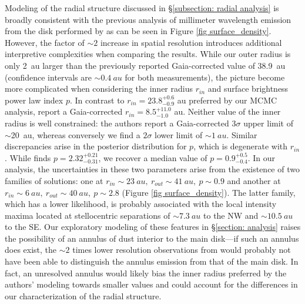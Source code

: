 \documentclass[modern]{aastex62}
\begin{document}
Modeling of the radial structure discussed in \S \ref{subsection: radial analysis} is broadly consistent with the previous analysis of millimeter wavelength emission from the disk performed by \citet{macgregor13} as can be seen in Figure \ref{fig surface_density}. 
However, the factor of $\sim 2$ increase in spatial resolution introduces additional interpretive complexities when comparing the results.
While our outer radius is only \SI{2}{au} larger than the previously reported Gaia-corrected value of \SI{38.9}{au} (confidence intervals are $\sim \SI{0.4}{au}$ for both measurements), the picture become more complicated when considering the inner radius $r_{in}$ and surface brightness power law index $p$.
In contrast to $r_{in} = 23.8_{-0.9}^{ +0.6}$ \si{au} preferred by our MCMC analysis, \citet{macgregor13} report a Gaia-corrected $r_{in} = 8.5_{-1.0} ^{+11.0}$ \si{au}.
Neither value of the inner radius is well constrained: the authors report a Gaia-corrected $3 \sigma$ upper limit of $\sim$\SI{20}{au}, whereas conversely we find a $2 \sigma$ lower limit of $\sim \SI{1}{au}$.
Similar discrepancies arise in the posterior distribution for $p$, which is degenerate with $r_{in}$.
While \citet{macgregor13} finds $p=2.32_{-0.31}^{+0.21}$, we recover a median value of $p=0.9_{-0.4}^{+0.5}$.
In our analysis, the uncertainties in these two parameters arise from the existence of two families of solutions: one at $r_{in} \sim \SI{23}{au},\ r_{out} \sim \SI{41}{au},\ p \sim 0.9$ and another at $r_{in} \sim \SI{6}{au},\ r_{out} \sim \SI{40}{au},\ p \sim 2.8$ (Figure \ref{fig surface_density}).
The latter family, which has a lower likelihood, is probably associated with the local intensity maxima located at stellocentric separations of $\sim \SI{7.3}{au}$ to the NW and $\sim \SI{10.5}{au}$ to the SE.
Our exploratory modeling of these features in \S \ref{section: analysis} raises the possibility of an annulus of dust interior to the main disk---if such an annulus does exist, the $\sim 2$ times lower resolution observations from \citet{macgregor13} would probably not have been able to distinguish the annulus emission from that of the main disk.
In fact, an unresolved annulus would likely bias the inner radius preferred by the authors' modeling towards smaller values and could account for the differences in our characterization of the radial structure.
\end{document}
